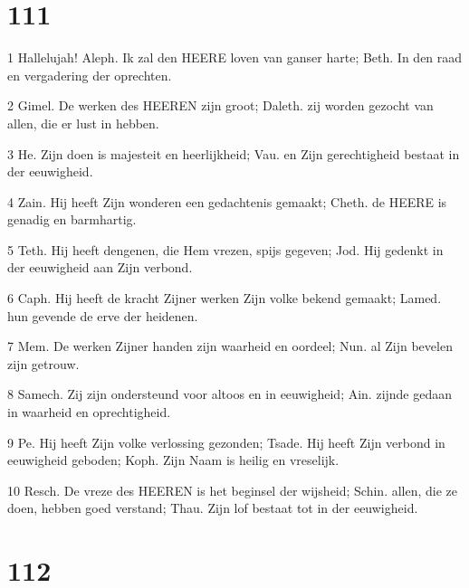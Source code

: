 \chapter{111}

\par 1 Hallelujah! Aleph. Ik zal den HEERE loven van ganser harte; Beth. In den raad en vergadering der oprechten.
\par 2 Gimel. De werken des HEEREN zijn groot; Daleth. zij worden gezocht van allen, die er lust in hebben.
\par 3 He. Zijn doen is majesteit en heerlijkheid; Vau. en Zijn gerechtigheid bestaat in der eeuwigheid.
\par 4 Zain. Hij heeft Zijn wonderen een gedachtenis gemaakt; Cheth. de HEERE is genadig en barmhartig.
\par 5 Teth. Hij heeft dengenen, die Hem vrezen, spijs gegeven; Jod. Hij gedenkt in der eeuwigheid aan Zijn verbond.
\par 6 Caph. Hij heeft de kracht Zijner werken Zijn volke bekend gemaakt; Lamed. hun gevende de erve der heidenen.
\par 7 Mem. De werken Zijner handen zijn waarheid en oordeel; Nun. al Zijn bevelen zijn getrouw.
\par 8 Samech. Zij zijn ondersteund voor altoos en in eeuwigheid; Ain. zijnde gedaan in waarheid en oprechtigheid.
\par 9 Pe. Hij heeft Zijn volke verlossing gezonden; Tsade. Hij heeft Zijn verbond in eeuwigheid geboden; Koph. Zijn Naam is heilig en vreselijk.
\par 10 Resch. De vreze des HEEREN is het beginsel der wijsheid; Schin. allen, die ze doen, hebben goed verstand; Thau. Zijn lof bestaat tot in der eeuwigheid.

\chapter{112}

